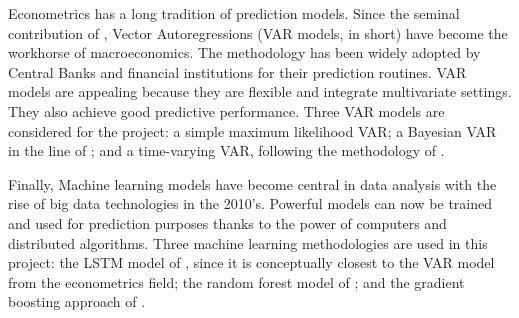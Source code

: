 Econometrics has a long tradition of prediction models. Since the seminal contribution of \cite{Sims1980}, Vector Autoregressions (VAR models, in short) have become the workhorse of macroeconomics. The methodology has been widely adopted by Central Banks and financial institutions for their prediction routines. VAR models are appealing because they are flexible and integrate multivariate settings. They also achieve good predictive performance. Three VAR models are considered for the project: a simple maximum likelihood VAR; a Bayesian VAR in the line of \cite{Karlsson2012}; and a time-varying VAR, following the methodology of \cite{Primiceri2005}.

Finally, Machine learning models have become central in data analysis with the rise of big data technologies in the 2010's. Powerful models can now be trained and used for prediction purposes thanks to the power of computers and distributed algorithms. Three machine learning methodologies are used in this project: the LSTM model of \cite{Hochreiter1997}, since it is conceptually closest to the VAR model from the econometrics field; the random forest model of \cite{Breiman2001}; and the gradient boosting approach of \cite{Friedman2001}.



